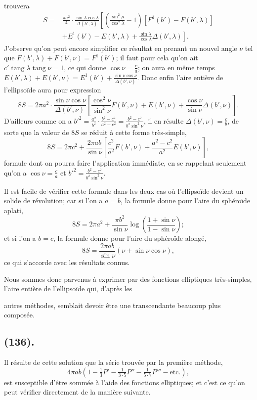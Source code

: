 \documentclass{article}
\begin{document}
trouvera
\[ \begin{aligned} S={}&\frac{\pi a^{2}}{4}\cdot\frac{\sin\lambda\cos\lambda}{\Delta(b',\lambda)}\left[\left(\frac{\sin^{2}\mu}{\cos^{2}\lambda}-1\right)[F^{1}(b')-F(b',\lambda)]\right.\\ &\left.+E^{1}(b')-E(b',\lambda)+\frac{\sin\lambda}{\cos\lambda}\Delta(b',\lambda)\right]. \end{aligned} \]
J'observe qu'on peut encore simplifier ce résultat en prenant un nouvel angle $\nu$ tel que $F(b',\lambda)+F(b',\nu)=F^{1}(b')$; il faut pour cela qu'on ait $c'\operatorname{tang}\lambda\operatorname{tang}\nu=1$, ce qui donne $\cos\nu=\frac{c}{a}$; on aura en même temps $E(b',\lambda)+E(b',\nu)=E^{1}(b')+\frac{\sin\nu\cos\nu}{\Delta(b',\nu)}$. Donc enfin l'aire entière de l'ellipsoïde aura pour expression
\[ 8S=2\pi a^{2}\cdot\frac{\sin\nu\cos\nu}{\Delta(b',\nu)}\left[\frac{\cos^{2}\nu}{\sin^{2}\nu}F(b',\nu)+E(b',\nu)+\frac{\cos\nu}{\sin\nu}\Delta(b',\nu)\right]. \]
D'ailleurs comme on a $b'^{2}=\frac{a^{2}}{b^{2}}\cdot\frac{b^{2}-c^{2}}{a^{2}-c^{2}}=\frac{b^{2}-c^{2}}{b^{2}\sin^{2}\nu}$, il en résulte $\Delta(b',\nu)=\frac{c}{b}$, de sorte que la valeur de $8S$ se réduit à cette forme très-simple,
\[ 8S=2\pi c^{2}+\frac{2\pi ab}{\sin\nu}\left[\frac{c^{2}}{a^{2}}F(b',\nu)+\frac{a^{2}-c^{2}}{a^{2}}E(b',\nu)\right], \]
formule dont on pourra faire l'application immédiate, en se rappelant seulement qu'on a $\cos\nu=\frac{c}{a}$ et $b'^{2}=\frac{b^{2}-c^{2}}{b^{2}\sin^{2}\nu}$.

Il est facile de vérifier cette formule dans les deux cas où l'ellipsoïde devient un solide de révolution; car si l'on a $a=b$, la formule donne pour l'aire du sphéroïde aplati,
\[ 8S=2\pi a^{2}+\frac{\pi b^{2}}{\sin\nu}\log\left(\frac{1+\sin\nu}{1-\sin\nu}\right); \]
et si l'on a $b=c$, la formule donne pour l'aire du sphéroïde alongé,
\[ 8S=\frac{2\pi ab}{\sin\nu}(\nu+\sin\nu\cos\nu), \]
ce qui s'accorde avec les résultats connus.

Nous sommes donc parvenus à exprimer par des fonctions elliptiques très-simples, l'aire entière de l'ellipsoïde qui, d'après les

autres méthodes, semblait devoir être une transcendante beaucoup plus composée.

\subsection*{(136).}

Il résulte de cette solution que la série trouvée par la première méthode,
\[ 4\pi ab\left(1-\tfrac{1}{3}P'-\tfrac{1}{3\cdot5}P''-\tfrac{1}{5\cdot7}P'''-\text{etc.}\right), \]
est susceptible d'être sommée à l'aide des fonctions elliptiques; et c'est ce qu'on peut vérifier directement de la manière suivante.
\end{document}
